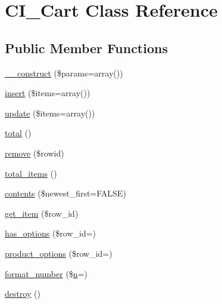 \hypertarget{class_c_i___cart}{}\section{C\+I\+\_\+\+Cart Class Reference}
\label{class_c_i___cart}
\subsection*{Public Member Functions}
\begin{DoxyCompactItemize}
\item 
\mbox{\hyperlink{class_c_i___cart_a568ecdb0d73d2a870f33189739922a50}{\+\_\+\+\_\+construct}} (\$params=array())
\item 
\mbox{\hyperlink{class_c_i___cart_a07488e002c513013079157a9fe61a8e3}{insert}} (\$items=array())
\item 
\mbox{\hyperlink{class_c_i___cart_adddf5d1a4f704b647f28b0322f8b64f2}{update}} (\$items=array())
\item 
\mbox{\hyperlink{class_c_i___cart_a9efa17b570797933c7c5b0c68f743a55}{total}} ()
\item 
\mbox{\hyperlink{class_c_i___cart_acb40031fae650e22e4a32878c02dfbf7}{remove}} (\$rowid)
\item 
\mbox{\hyperlink{class_c_i___cart_a785be13903ee65b8936d523b2728e53a}{total\+\_\+items}} ()
\item 
\mbox{\hyperlink{class_c_i___cart_a9d7b86f0ac41c6301e6373644011d87f}{contents}} (\$newest\+\_\+first=F\+A\+L\+SE)
\item 
\mbox{\hyperlink{class_c_i___cart_a73841dfae18a2719c7eb6d31978067a9}{get\+\_\+item}} (\$row\+\_\+id)
\item 
\mbox{\hyperlink{class_c_i___cart_a276cedf02c823357a2b643a13806f2be}{has\+\_\+options}} (\$row\+\_\+id=\textquotesingle{}\textquotesingle{})
\item 
\mbox{\hyperlink{class_c_i___cart_a461e270ceff8b04d40e14e00b9c74447}{product\+\_\+options}} (\$row\+\_\+id=\textquotesingle{}\textquotesingle{})
\item 
\mbox{\hyperlink{class_c_i___cart_aea64eda9cf978b1e25c24458ca7e69df}{format\+\_\+number}} (\$\mbox{\hyperlink{cli_2error__php_8php_a2e6b16bbc42094e4c51ade3c10afdcf1}{n}}=\textquotesingle{}\textquotesingle{})
\item 
\mbox{\hyperlink{class_c_i___cart_aa118461de946085fe42989193337044a}{destroy}} ()
\end{DoxyCompactItemize}

